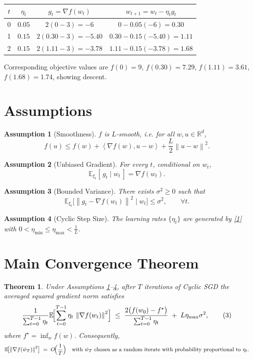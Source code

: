 \documentclass[11pt]{article}
\newtheorem{theorem}{Theorem}
\newtheorem{assumption}{Assumption}
\newcommand{\EE}{\mathbb{E}}
\newcommand{\RR}{\mathbb{R}}
\newcommand{\norm}[1]{\left\lVert #1 \right\rVert}
\newcommand{\inner}[2]{\left\langle #1,#2 \right\rangle}
\begin{document}
\begin{center}
\begin{tabular}{c|c|c|c}
$t$ & $\eta_t$ & $g_t=\nabla f(w_t)$ & $w_{t+1}=w_t-\eta_t g_t$ \\ \hline
0 & $0.05$ & $2(0-3)=-6$ & $0-0.05(-6)=0.30$ \\
1 & $0.15$ & $2(0.30-3)=-5.40$ & $0.30-0.15(-5.40)=1.11$ \\
2 & $0.15$ & $2(1.11-3)=-3.78$ & $1.11-0.15(-3.78)=1.68$
\end{tabular}
\end{center}
Corresponding objective values are $f(0)=9$, $f(0.30)=7.29$, $f(1.11)=3.61$, $f(1.68)=1.74$,
showing descent.

\newpage

\section*{Assumptions}
\begin{assumption}[Smoothness]\label{as:smooth}
$f$ is $L$‑smooth, i.e. for all $w,u\in\RR^{d}$,
\[
f(u)\le f(w)+\inner{\nabla f(w)}{u-w}+\frac{L}{2}\norm{u-w}^2 .
\]
\end{assumption}
\begin{assumption}[Unbiased Gradient]\label{as:unbiased}
For every $t$, conditional on $w_t$,
\[
\EE_{\xi_t}[\,g_t\mid w_t\,]=\nabla f(w_t).
\]
\end{assumption}
\begin{assumption}[Bounded Variance]\label{as:variance}
There exists $\sigma^2\ge0$ such that
\[
\EE_{\xi_t}\!\bigl[\norm{g_t-\nabla f(w_t)}^2\mid w_t\bigr]\le\sigma^2,\qquad\forall t.
\]
\end{assumption}
\begin{assumption}[Cyclic Step Size]\label{as:step}
The learning rates $\{\eta_t\}$ are generated by \eqref{1} with
$0<\eta_{\min}\le\eta_{\max}<\frac{1}{L}$.
\end{assumption}

\section*{Main Convergence Theorem}
\begin{theorem}\label{thm:main}
Under Assumptions \ref{as:smooth}–\ref{as:step}, after $T$ iterations of
Cyclic SGD the averaged squared gradient norm satisfies
\[
\frac{1}{\sum_{t=0}^{T-1}\eta_t}
\EE\!\Bigl[\sum_{t=0}^{T-1}\eta_t\,\norm{\nabla f(w_t)}^2\Bigr]
\;\le\;
\frac{2\bigl(f(w_0)-f^{\star}\bigr)}{\sum_{t=0}^{T-1}\eta_t}
\;+\;
L\eta_{\max}\sigma^2 ,
\tag{3}
\]
where $f^{\star}=\inf_{w}f(w)$.  Consequently,
\[
\EE\!\bigl[\norm{\nabla f(\bar w_T)}^2\bigr]
\;=\;O\!\Bigl(\frac{1}{T}\Bigr)
\quad\text{with }\bar w_T \text{ chosen as a random iterate with
probability proportional to }\eta_t .
\]
\end{theorem}
\end{document}
